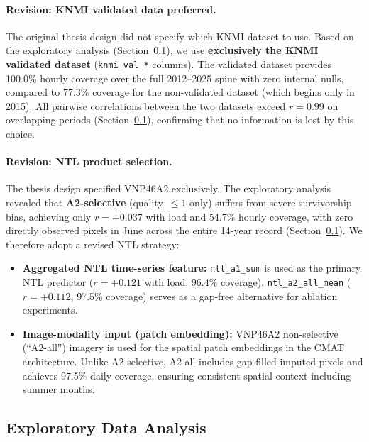 \paragraph{Revision: KNMI validated data preferred.}
The original thesis design did not specify which KNMI dataset to use. Based on the exploratory analysis (Section~\ref{subsec:eda}), we use \textbf{exclusively the KNMI validated dataset} (\texttt{knmi\_val\_*} columns). The validated dataset provides 100.0\% hourly coverage over the full 2012--2025 spine with zero internal nulls, compared to 77.3\% coverage for the non-validated dataset (which begins only in 2015). All pairwise correlations between the two datasets exceed $r = 0.99$ on overlapping periods (Section~\ref{subsec:eda}), confirming that no information is lost by this choice.

\paragraph{Revision: NTL product selection.}
The thesis design specified VNP46A2 exclusively. The exploratory analysis revealed that \textbf{A2-selective} (quality~$\leq 1$ only) suffers from severe survivorship bias, achieving only $r = +0.037$ with load and 54.7\% hourly coverage, with zero directly observed pixels in June across the entire 14-year record (Section~\ref{subsec:eda}). We therefore adopt a revised NTL strategy:
\begin{itemize}
    \item \textbf{Aggregated NTL time-series feature:} \texttt{ntl\_a1\_sum} is used as the primary NTL predictor ($r = +0.121$ with load, 96.4\% coverage). \texttt{ntl\_a2\_all\_mean} ($r = +0.112$, 97.5\% coverage) serves as a gap-free alternative for ablation experiments.
    \item \textbf{Image-modality input (patch embedding):} VNP46A2 non-selective (``A2-all'') imagery is used for the spatial patch embeddings in the CMAT architecture. Unlike A2-selective, A2-all includes gap-filled imputed pixels and achieves 97.5\% daily coverage, ensuring consistent spatial context including summer months.
\end{itemize}


\subsection{Exploratory Data Analysis}
\label{subsec:eda}

